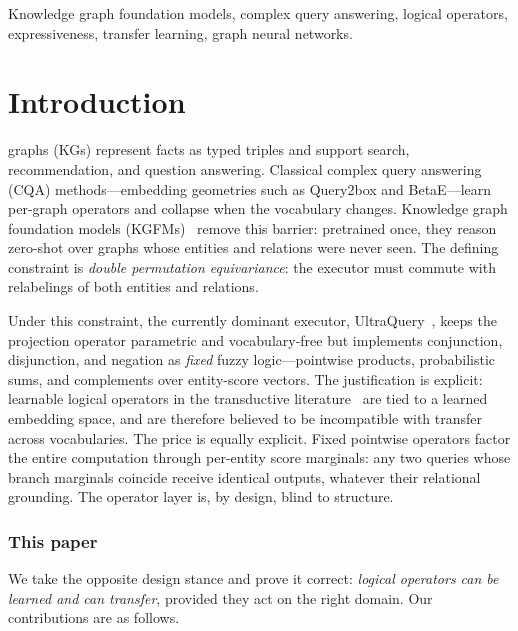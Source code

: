 \documentclass[journal]{IEEEtran}
\begin{document}
\begin{IEEEkeywords}
Knowledge graph foundation models, complex query answering, logical
operators, expressiveness, transfer learning, graph neural networks.
\end{IEEEkeywords}

\IEEEpeerreviewmaketitle

\section{Introduction}
 graphs (KGs) represent facts as typed triples and
support search, recommendation, and question answering. Classical complex
query answering (CQA) methods---embedding geometries such as Query2box and
BetaE---learn per-graph operators and collapse when the vocabulary changes.
Knowledge graph foundation models (KGFMs)~\cite{galkin2024ultra} remove this
barrier: pretrained once, they reason zero-shot over graphs whose entities
and relations were never seen. The defining constraint is \emph{double
permutation equivariance}: the executor must commute with relabelings of
both entities and relations.

Under this constraint, the currently dominant executor,
UltraQuery~\cite{galkin2024ultraquery}, keeps the projection operator
parametric and vocabulary-free but implements conjunction, disjunction, and
negation as \emph{fixed} fuzzy logic---pointwise products, probabilistic
sums, and complements over entity-score vectors. The justification is
explicit: learnable logical operators in the transductive
literature~\cite{hamilton2018query2box,ren2020betae} are tied to a learned
embedding space, and are therefore believed to be incompatible with
transfer across vocabularies. The price is equally explicit. Fixed pointwise
operators factor the entire computation through per-entity score marginals:
any two queries whose branch marginals coincide receive identical outputs,
whatever their relational grounding. The operator layer is, by design, blind
to structure.

\subsubsection*{This paper} We take the opposite design stance and prove it
correct: \emph{logical operators can be learned and can transfer}, provided
they act on the right domain. Our contributions are as follows.
\end{document}
